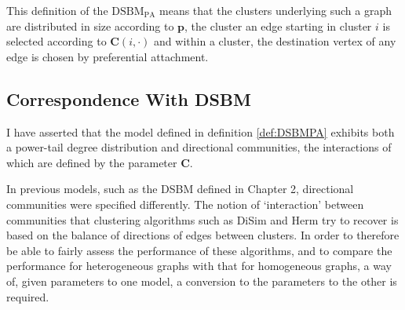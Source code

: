 This definition of the $\mathrm{DSBM}_\mathrm{PA}$ means that the clusters underlying such a graph 
are distributed in size according to $\mathbf{p}$, the cluster an edge starting in cluster $i$ is 
selected according to $\mathbf{C}(i, \cdot)$ and within a cluster, the destination vertex of any 
edge is chosen by preferential attachment.

\subsection{Correspondence With DSBM}
I have asserted that the model defined in definition \ref{def:DSBMPA} exhibits both a power-tail 
degree distribution  and directional communities, the 
interactions of which are defined by the parameter $\mathbf{C}$. 

In previous models, such as the DSBM defined in Chapter 2, directional communities were specified 
differently. The notion of `interaction' between communities that clustering 
algorithms such as DiSim and Herm try to recover is based on the balance of directions of edges 
between clusters. In order to therefore be able to fairly assess the performance of these 
algorithms, and to compare the performance for heterogeneous graphs with that for homogeneous 
graphs, a way of, given parameters to one model, a conversion to the parameters to the other is 
required.

